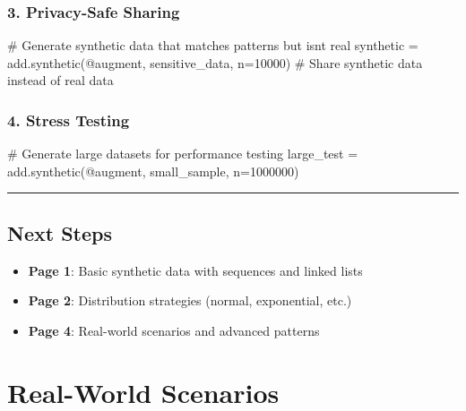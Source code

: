 \documentclass[
  letterpaper,
]{scrbook}
\newenvironment{Shaded}{\begin{snugshade}}{\end{snugshade}}
\newcommand{\CommentTok}[1]{\textcolor[rgb]{0.37,0.37,0.37}{#1}}
\newcommand{\DecValTok}[1]{\textcolor[rgb]{0.68,0.00,0.00}{#1}}
\newcommand{\NormalTok}[1]{\textcolor[rgb]{0.00,0.23,0.31}{#1}}
\newcommand{\OperatorTok}[1]{\textcolor[rgb]{0.37,0.37,0.37}{#1}}
\newcommand{\StringTok}[1]{\textcolor[rgb]{0.13,0.47,0.30}{#1}}
\providecommand{\tightlist}{%
  \setlength{\itemsep}{0pt}\setlength{\parskip}{0pt}}
\begin{document}
\subsection{3. Privacy-Safe Sharing}\label{privacy-safe-sharing}

\begin{Shaded}
\begin{Highlighting}[]
\CommentTok{\# Generate synthetic data that matches patterns but isn\textquotesingle{}t real}
\NormalTok{synthetic }\OperatorTok{=}\NormalTok{ add.synthetic(}\StringTok{\textquotesingle{}@augment\textquotesingle{}}\NormalTok{, sensitive\_data, n}\OperatorTok{=}\DecValTok{10000}\NormalTok{)}
\CommentTok{\# Share synthetic data instead of real data}
\end{Highlighting}
\end{Shaded}

\subsection{4. Stress Testing}\label{stress-testing}

\begin{Shaded}
\begin{Highlighting}[]
\CommentTok{\# Generate large datasets for performance testing}
\NormalTok{large\_test }\OperatorTok{=}\NormalTok{ add.synthetic(}\StringTok{\textquotesingle{}@augment\textquotesingle{}}\NormalTok{, small\_sample, n}\OperatorTok{=}\DecValTok{1000000}\NormalTok{)}
\end{Highlighting}
\end{Shaded}

\begin{center}\rule{0.5\linewidth}{0.5pt}\end{center}

\section{Next Steps}\label{next-steps-14}

\begin{itemize}
\tightlist
\item
  \textbf{Page 1}: Basic synthetic data with sequences and linked lists
\item
  \textbf{Page 2}: Distribution strategies (normal, exponential, etc.)
\item
  \textbf{Page 4}: Real-world scenarios and advanced patterns
\end{itemize}

\chapter{Real-World Scenarios}\label{real-world-scenarios}
\end{document}
